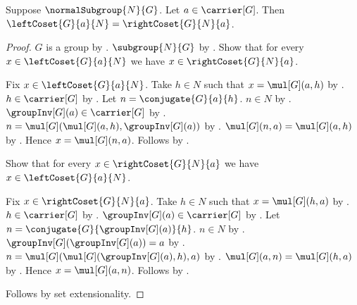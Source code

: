 \begin{theorem}\label{normal_left_coset_eq_right_coset}
    Suppose $\normalSubgroup{N}{G}$.
    Let $a\in\carrier[G]$.
    Then $\leftCoset{G}{a}{N}=\rightCoset{G}{N}{a}$.
\end{theorem}
\begin{proof}
    $G$ is a group by .
    $\subgroup{N}{G}$ by .
    Show that for every $x\in\leftCoset{G}{a}{N}$ we have
        $x\in\rightCoset{G}{N}{a}$.
    \begin{subproof}
        Fix $x\in\leftCoset{G}{a}{N}$.
        Take $h\in N$ such that $x=\mul[G](a,h)$ by
            .
        $h\in\carrier[G]$ by
            .
        Let $n=\conjugate{G}{a}{h}$.
        $n\in N$ by .
        $\groupInv[G](a)\in\carrier[G]$ by
            .
        $n=\mul[G](\mul[G](a,h),\groupInv[G](a))$ by
            .
        $\mul[G](n,a)=\mul[G](a,h)$ by
            .
        Hence $x=\mul[G](n,a)$.
        Follows by .
    \end{subproof}
    Show that for every $x\in\rightCoset{G}{N}{a}$ we have
        $x\in\leftCoset{G}{a}{N}$.
    \begin{subproof}
        Fix $x\in\rightCoset{G}{N}{a}$.
        Take $h\in N$ such that $x=\mul[G](h,a)$ by
            .
        $h\in\carrier[G]$ by
            .
        $\groupInv[G](a)\in\carrier[G]$ by
            .
        Let $n=\conjugate{G}{\groupInv[G](a)}{h}$.
        $n\in N$ by .
        $\groupInv[G](\groupInv[G](a))=a$ by
            .
        $n=\mul[G](\mul[G](\groupInv[G](a),h),a)$ by
            .
        $\mul[G](a,n)=\mul[G](h,a)$ by
            .
        Hence $x=\mul[G](a,n)$.
        Follows by .
    \end{subproof}
    Follows by set extensionality.
\end{proof}
